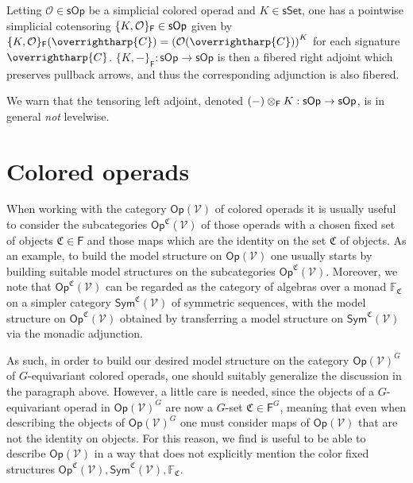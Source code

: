 \documentclass[a4paper,10pt
,draft
]{article}%
\renewcommand{\1}{\eta}%
\newcommand{\vect}[1]{\text{\overrightharp{\ensuremath{#1}}}}
\begin{document}
\begin{example}
      \label{COTENS_EX}
      Letting $\mathcal{O} \in \mathsf{sOp}$ be a simplicial colored operad
      and $K \in \mathsf{sSet}$,
      one has a pointwise simplicial cotensoring
      $\{K,\mathcal{O}\}_{\mathsf{F}} \in \mathsf{sOp}$
      given by
      $\{K,\O\}_{\mathsf{F}}(\vect C) = 
      \left(\O(\vect C)\right)^K$
      for each signature $\vect C$.
      $\{K,-\}_{\mathsf{F}}\colon \mathsf{sOp} \to \mathsf{sOp}$
      is then a fibered right adjoint which preserves pullback arrows,
      and thus the corresponding adjunction is also fibered.
      
      We warn that the tensoring left adjoint, denoted $(-) \otimes_{\mathsf{F}} K: \mathsf{sOp} \to \mathsf{sOp}$, is in general \textit{not} levelwise.
\end{example}





\section{Colored operads}


When working with the category $\mathsf{Op}(\mathcal{V})$
of colored operads it is usually useful to consider the subcategories $\mathsf{Op}^{\mathfrak{C}}(\mathcal{V})$
of those operads with a chosen fixed set of objects
$\mathfrak{C} \in \mathsf{F}$ and those maps which are the identity on the set $\mathfrak{C}$ of objects.
As an example, to build the model structure on $\mathsf{Op}(\mathcal{V})$ one usually starts by building suitable model structures on the subcategories $\mathsf{Op}^{\mathfrak{C}}(\mathcal{V})$.
Moreover, we note that $\mathsf{Op}^{\mathfrak{C}}(\mathcal{V})$ can be regarded as the category of algebras over a monad 
$\mathbb{F}_{\mathfrak{C}}$ on a simpler category
$\mathsf{Sym}^{\mathfrak{C}}(\mathcal{V})$ of symmetric sequences, 
with the model structure on
$\mathsf{Op}^{\mathfrak{C}}(\mathcal{V})$
obtained by transferring a model structure on 
$\mathsf{Sym}^{\mathfrak{C}}(\mathcal{V})$
via the monadic adjunction.

As such, in order to build our desired model structure on the category $\mathsf{Op}(\mathcal{V})^G$ of $G$-equivariant colored operads, one should suitably generalize the discussion in the paragraph above.
However, a little care is needed, since the objects of a $G$-equivariant operad in $\mathsf{Op}(\mathcal{V})^G$ are now a $G$-set $\mathfrak{C} \in \mathsf{F}^G$, meaning that even when describing the objects of 
$\mathsf{Op}(\mathcal{V})^G$ one must consider maps of 
$\mathsf{Op}(\mathcal{V})$ that are not the identity on objects.
For this reason, we find is useful to be able to describe 
$\mathsf{Op}(\mathcal{V})$ 
in a way that does not explicitly mention the color fixed structures
$\mathsf{Op}^{\mathfrak{C}}(\mathcal{V}),
\mathsf{Sym}^{\mathfrak{C}}(\mathcal{V}),
\mathbb{F}_{\mathfrak{C}}$.
\end{document}

